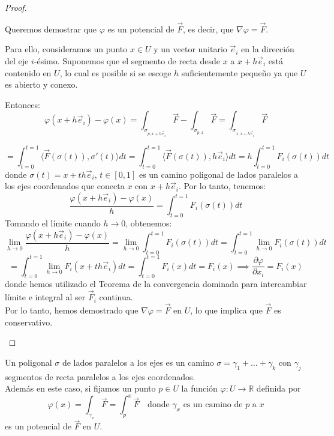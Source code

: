 \begin{proof}
\begin{itemize}
        Queremos demostrar que \(\varphi\) es un potencial de \(\vec{F}\), es decir, que \(\nabla \varphi = \vec{F}\).

        Para ello, consideramos un punto \(x \in U\) y un vector unitario \(\vec{e}_i\) en la dirección del eje \(i\)-ésimo. Suponemos que el segmento de recta desde \(x\) a \(x + h \vec{e}_i\) está contenido en \(U\), lo cual es posible si se escoge $h$ suficientemente pequeño ya que \(U\) es abierto y conexo.

        Entonces:
        \[
            \varphi(x + h \vec{e}_i) - \varphi(x) = \int_{\sigma_{p,x+h\vec{e}_i}} \vec{F} - \int_{\sigma_{p,x}} \vec{F} = \int_{\sigma_{x,x+h\vec{e}_i}} \vec{F}
        \]

        \[
            = \int_{t=0}^{t=1} \langle \vec{F}(\sigma(t)), \sigma'(t) \rangle dt
            = \int_{t=0}^{t=1} \langle \vec{F}(\sigma(t)), h \vec{e}_i \rangle dt
            = h \int_{t=0}^{t=1} F_i(\sigma(t)) dt
        \]
        donde \(\sigma(t) = x + t h \vec{e}_i\), $t \in [0,1]$ es un camino poligonal de lados paralelos a los ejes coordenados que conecta \(x\) con \(x + h \vec{e}_i\).
        Por lo tanto, tenemos:
        \[
            \frac{\varphi(x + h \vec{e}_i) - \varphi(x)}{h} = \int_{t=0}^{t=1} F_i(\sigma(t)) dt
        \]
        Tomando el límite cuando \(h \to 0\), obtenemos:
        \[
            \lim_{h \to 0} \frac{\varphi(x + h \vec{e}_i) - \varphi(x)}{h} = \lim_{h \to 0} \int_{t=0}^{t=1} F_i(\sigma(t)) dt = \int_{t=0}^{t=1} \lim_{h \to 0} F_i(\sigma(t)) dt
        \]
        \[
            = \int_{t=0}^{t=1} \lim_{h \to 0} F_i(x + t h \vec{e}_i) dt = \int_{t=0}^{t=1} F_i(x) dt = F_i(x) \implies \frac{\partial \varphi}{\partial x_i} = F_i(x)
        \]
        donde hemos utilizado el Teorema de la convergencia dominada para intercambiar límite e integral al ser $\vec{F}_i$ continua.\\
        Por lo tanto, hemos demostrado que \(\nabla \varphi = \vec{F}\) en \(U\), lo que implica que \(\vec{F}\) es conservativo.
    \end{itemize}
\end{proof}

\begin{observación}
Un poligonal $\sigma$ de lados paralelos a los ejes es un camino $\sigma = \gamma_1 + \ldots + \gamma_k$ con $\gamma_j$ segmentos de recta paralelos a los ejes coordenados.\\
Además en este caso, si fijamos un punto $p \in U$ la función $\varphi: U \to \mathbb{R}$ definida por
\[
    \varphi(x) = \int_{\gamma_x} \vec{F} = \int_{p}^{x} \vec{F} \quad \text{donde } \gamma_x \text{ es un camino de } p \text{ a } x
\]
es un potencial de $\vec{F}$ en $U$.
\end{observación}

